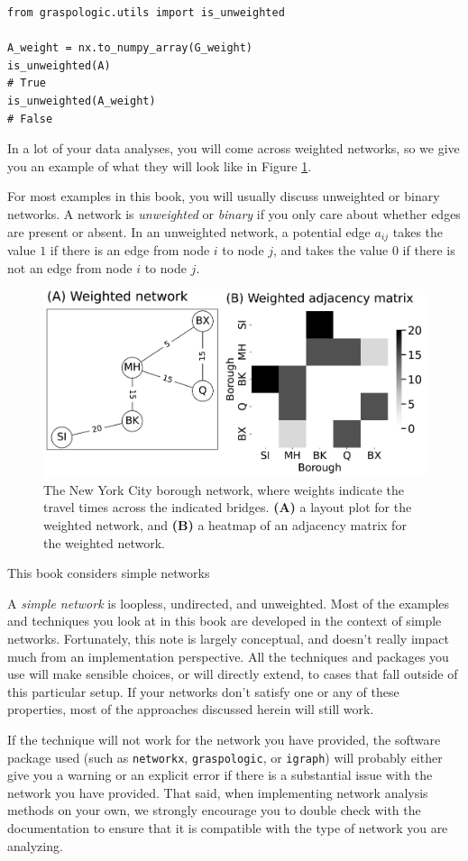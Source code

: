 \begin{lstlisting}[style=python]
from graspologic.utils import is_unweighted

A_weight = nx.to_numpy_array(G_weight)
is_unweighted(A)
# True
is_unweighted(A_weight)
# False
\end{lstlisting}
In a lot of your data analyses, you will come across weighted networks, so we give you an example of what they will look like in Figure \ref{fig:ch4:weighted}.

For most examples in this book, you will usually discuss {unweighted} or {binary} networks. A network is \textit{unweighted} or \textit{binary} if you only care about whether edges are {present} or {absent}. In an unweighted network, a potential edge $a_{ij}$ takes the value $1$ if there is an edge from node $i$ to node $j$, and takes the value $0$ if there is {not} an edge from node $i$ to node $j$.

\begin{figure}
    \centering
    \includegraphics[width=0.8\linewidth]{representations/ch4/Images/weighted.png}
    \caption[Weighted network in New York borough example]{The New York City borough network, where weights indicate the travel times across the indicated bridges. \textbf{(A)} a layout plot for the weighted network, and \textbf{(B)} a heatmap of an adjacency matrix for the weighted network.}
    \label{fig:ch4:weighted}
\end{figure}

\begin{floatingbox}[h]\caption{This book considers {simple networks}}
A \textit{simple network} is loopless, undirected, and unweighted. Most of the examples and techniques you look at in this book are developed in the context of simple networks. Fortunately, this note is largely conceptual, and doesn't really impact much from an implementation perspective. All the techniques and packages you use will make sensible choices, or will directly extend, to cases that fall outside of this particular setup. If your networks don't satisfy one or any of these properties, most of the approaches discussed herein will still work. 

If the technique will not work for the network you have provided, the software package used (such as \texttt{networkx}, \texttt{graspologic}, or \texttt{igraph}) will probably either give you a warning or an explicit error if there is a substantial issue with the network you have provided. That said, when implementing network analysis methods on your own, we strongly encourage you to double check with the documentation to ensure that it is {compatible} with the type of network you are analyzing.
\end{floatingbox}

